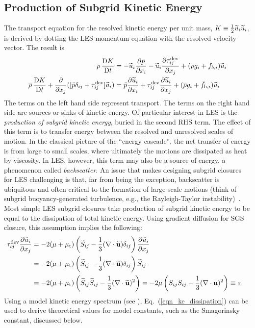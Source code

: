\subsection{Production of Subgrid Kinetic Energy}

The transport equation for the resolved kinetic energy per unit mass, $K\equiv \mbox{$\frac{1}{2}$} \widetilde{u}_i\widetilde{u}_i$, is derived by dotting the LES momentum equation with the resolved velocity vector.  The result is
\begin{align}
\label{eqn_LES_KE}
\overline{\rho} \,\frac{\mathrm{D} K}{\mathrm{D} t} &= -\widetilde{u}_i\frac{\partial \bar{p}}{\partial x_i} - \widetilde{u}_i\frac{\partial \tau_{ij}^{\rm dev}}{\partial x_j} + (\overline{\rho} g_i + \bar{f}_{b,i}) \widetilde{u}_i \notag \\
\overline{\rho} \,\frac{\mathrm{D} K}{\mathrm{D} t} + \frac{\partial}{\partial x_j} ([\bar{p}\delta_{ij} + \tau_{ij}^{\rm dev}]\widetilde{u}_i) &=  \bar{p} \frac{\partial \widetilde{u}_i}{\partial x_i} + \tau_{ij}^{\rm dev}\frac{\partial \widetilde{u}_i}{\partial x_j} + (\overline{\rho} g_i + \bar{f}_{{\rm b},i}) \widetilde{u}_i
\end{align}
The terms on the left hand side represent transport.  The terms on the right hand side are sources or sinks of kinetic energy.  Of particular interest in LES is the \emph{production of subgrid kinetic energy}, buried in the second RHS term.  The effect of this term is to transfer energy between the resolved and unresolved scales of motion.  In the classical picture of the ``energy cascade'', the net transfer of energy is from large to small scales, where ultimately the motions are dissipated as heat by viscosity.  In LES, however, this term may also be a source of energy, a phenomenon called \emph{backscatter}.  An issue that makes designing subgrid closures for LES challenging is that, far from being the exception, backscatter is ubiquitous and often critical to the formation of large-scale motions (think of subgrid buoyancy-generated turbulence, e.g., the Rayleigh-Taylor instability)~\cite{Piomelli:1991}.
Most simple LES subgrid closures take production of subgrid kinetic energy to be equal to the dissipation of total kinetic energy.  Using gradient diffusion for SGS closure, this assumption implies the following:
\begin{align}
\label{eqn_ke_dissipation}
\tau_{ij}^{\rm dev}\frac{\partial \widetilde{u}_i}{\partial x_j} &= - 2 (\mu + \mu_{\rm t}) \left(\widetilde{S}_{ij} - \frac{1}{3}(\nabla\cdot \widetilde{\mathbf{u}}) \delta_{ij} \right) \frac{\partial \widetilde{u}_i}{\partial x_j} && \notag\\
&= - 2 (\mu + \mu_{\rm t}) \left(\widetilde{S}_{ij} - \frac{1}{3}(\nabla\cdot \widetilde{\mathbf{u}}) \delta_{ij} \right) \widetilde{S}_{ij} && \notag \\
&= - 2 (\mu + \mu_{\rm t}) \left(\widetilde{S}_{ij}\widetilde{S}_{ij} - \frac{1}{3}(\nabla\cdot \widetilde{\mathbf{u}})^2 \right) = -2\mu \left(S_{ij}S_{ij} - \frac{1}{3}(\nabla\cdot \mathbf{u})^2 \right) \equiv \varepsilon
\end{align}
Using a model kinetic energy spectrum (see \cite{Pope:2000}), Eq.~(\ref{eqn_ke_dissipation}) can be used to derive theoretical values for model constants, such as the Smagorinsky constant, discussed below.

